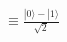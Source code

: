 \documentclass[preview]{standalone}
\begin{document}
\begin{align*}
\equiv \frac{|0\rangle - |1\rangle}{\sqrt{2}}
\end{align*}
\end{document}
